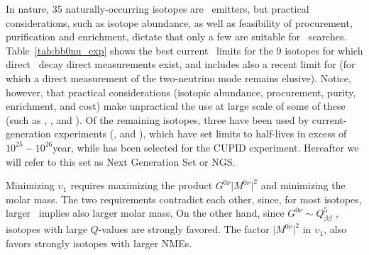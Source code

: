 In nature, 35 naturally-occurring isotopes are \bb\ emitters, but practical considerations, such as isotope abundance, as well as feasibility of procurement,   purification and enrichment, dictate that only a few are suitable for \bbonu\ searches. 
Table~\ref{tab:bb0nu_exp} shows the best current \bbonu\ limits for the 9 isotopes for which direct \bbtnu\ decay direct measurements exist, and includes also a recent limit for   (for which a direct measurement of the two-neutrino mode remains elusive). Notice, however, that practical considerations (isotopic abundance, procurement, purity, enrichment, and cost) make unpractical the use at large scale of some of these (such as , ,  and ). Of the remaining isotopes, three have been used by current-generation experiments (,  and ), which have set limits to \bbonu half-lives in excess of $10^{25}-10^{26}$year, while  has been selected for the CUPID experiment. Hereafter we will refer to this set as Next Generation Set or NGS. 


Minimizing $\upsilon_1$ requires maximizing the product $G^{0\nu}\lvert M^{0\nu}\rvert^2$ and minimizing the molar mass. The two requirements contradict each other, since, for most isotopes, larger \Qbb\ implies also larger molar mass. On the other hand, since $G^{0\nu} \sim Q_{\beta\beta}^5$ \cite{Vogel:2008sx}, isotopes with large $Q$-values are strongly favored. The factor $\lvert M^{0\nu}\rvert^2$ in $\upsilon_1$, also favors strongly isotopes with larger NMEs. 


%
%

